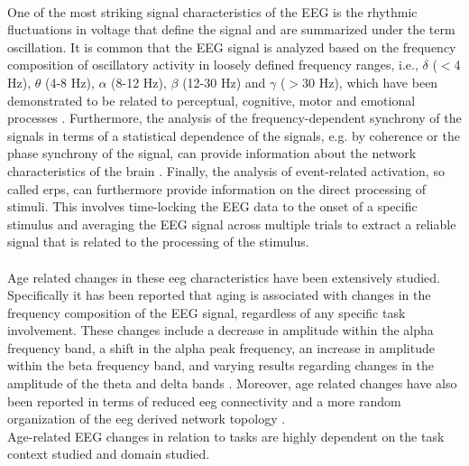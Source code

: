 \\
One of the most striking signal characteristics of the EEG is the rhythmic fluctuations in voltage that define the signal and are summarized under the term oscillation. It is common that the EEG signal is analyzed based on the frequency composition of oscillatory activity in loosely defined frequency ranges, i.e., $\delta$ ($<$4 Hz), $\theta$ (4-8 Hz), $\alpha$ (8-12 Hz), $\beta$ (12-30 Hz) and $\gamma$ ($>$30 Hz), which have been demonstrated to be related to perceptual, cognitive, motor and emotional processes \cite{CohenX2017}. Furthermore, the analysis of the frequency-dependent synchrony of the signals in terms of a statistical dependence of the signals, e.g. by coherence or the phase synchrony of the signal, can provide information about the network characteristics of the brain \cite{Siegel2012}. Finally, the analysis of event-related activation, so called \glspl{erp}, can furthermore provide information on the direct processing of stimuli. This involves time-locking the EEG data to the onset of a specific stimulus and averaging the EEG signal across multiple trials to extract a reliable signal that is related to the processing of the stimulus.\\
\\
Age related changes in these \gls{eeg} characteristics have been extensively studied. 
Specifically it has been reported that aging is associated with changes in the frequency composition of the EEG signal, regardless of any specific task involvement. These changes include a decrease in amplitude within the alpha frequency band, a shift in the alpha peak frequency, an increase in amplitude within the beta frequency band, and varying results regarding changes in the amplitude of the theta and delta bands \cite{ROSSINI2007375, Ishii2017, Courtney2021}. Moreover, age related changes have also been reported in terms of reduced \gls{eeg} connectivity and a more random organization of the \gls{eeg} derived network topology \cite{Smit2012}.\\
Age-related EEG changes in relation to tasks are highly dependent on the task context studied and domain studied. 

